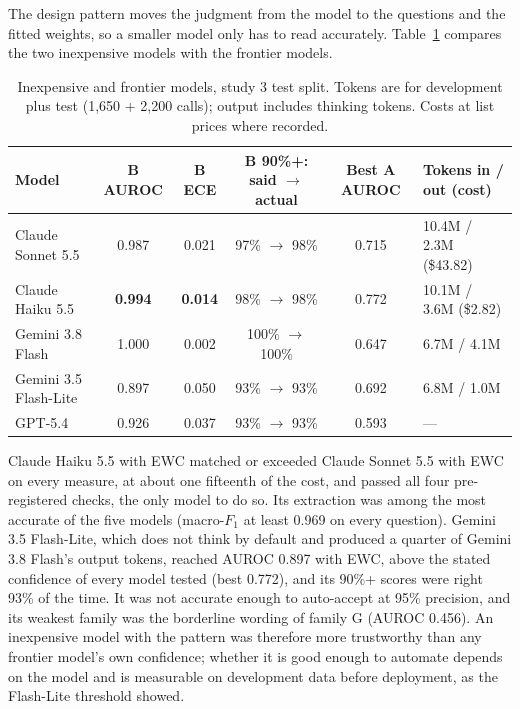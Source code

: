 \documentclass[10pt,letterpaper]{article}
\begin{document}
The design pattern moves the judgment from the model to the questions and the fitted weights, so a smaller model only has to read accurately. Table~\ref{tab:cost} compares the two inexpensive models with the frontier models.

\begin{table}[!htbp]
\centering\footnotesize\setlength{\tabcolsep}{4pt}
\caption{Inexpensive and frontier models, study 3 test split. Tokens are for development plus test (1,650 + 2,200 calls); output includes thinking tokens. Costs at list prices where recorded.}\label{tab:cost}
\begin{tabular}{@{}lccccl@{}}
\toprule
Model & B AUROC & B ECE & B 90\%+: said $\rightarrow$ actual & Best A AUROC & Tokens in / out (cost) \\
\midrule
Claude Sonnet 5.5 & 0.987 & 0.021 & 97\% $\rightarrow$ 98\% & 0.715 & 10.4M / 2.3M (\$43.82) \\
Claude Haiku 5.5 & \textbf{0.994} & \textbf{0.014} & 98\% $\rightarrow$ 98\% & 0.772 & 10.1M / 3.6M (\$2.82) \\
\midrule
Gemini 3.8 Flash & 1.000 & 0.002 & 100\% $\rightarrow$ 100\% & 0.647 & 6.7M / 4.1M \\
Gemini 3.5 Flash-Lite & 0.897 & 0.050 & 93\% $\rightarrow$ 93\% & 0.692 & 6.8M / 1.0M \\
\midrule
GPT-5.4 & 0.926 & 0.037 & 93\% $\rightarrow$ 93\% & 0.593 & --- \\
\bottomrule
\end{tabular}
\end{table}

Claude Haiku 5.5 with EWC matched or exceeded Claude Sonnet 5.5 with EWC on every measure, at about one fifteenth of the cost, and passed all four pre-registered checks, the only model to do so. Its extraction was among the most accurate of the five models (macro-$F_1$ at least 0.969 on every question). Gemini 3.5 Flash-Lite, which does not think by default and produced a quarter of Gemini 3.8 Flash's output tokens, reached AUROC 0.897 with EWC, above the stated confidence of every model tested (best 0.772), and its 90\%+ scores were right 93\% of the time. It was not accurate enough to auto-accept at 95\% precision, and its weakest family was the borderline wording of family G (AUROC 0.456). An inexpensive model with the pattern was therefore more trustworthy than any frontier model's own confidence; whether it is good enough to automate depends on the model and is measurable on development data before deployment, as the Flash-Lite threshold showed.
\end{document}
